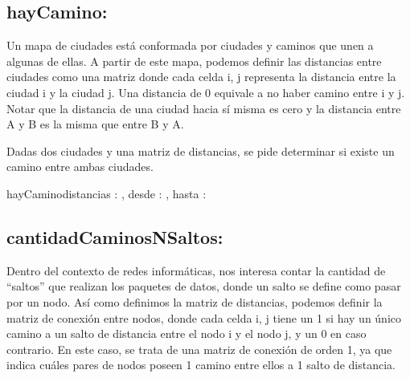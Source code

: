 \documentclass[10pt,a4paper]{article}
\begin{document}


\subsection{hayCamino:}

Un mapa de ciudades está conformada por ciudades y caminos que unen a algunas de ellas.
A partir de este mapa, podemos definir las distancias entre ciudades como una matriz donde cada celda i, j representa la distancia entre la ciudad i y la ciudad j. Una distancia de 0 equivale a no haber camino entre i y j.
Notar que la distancia de una ciudad hacia sí misma es cero y la distancia entre A y B es la misma que entre B y A.

Dadas dos ciudades y una matriz de distancias, se pide determinar si existe un camino entre ambas ciudades.\\

\begin{proc}{hayCamino}{\In distancias : \TLista{\TLista{\ent}}, \In desde : \ent, \In hasta : \ent}{\bool}
\end{proc}


\subsection{cantidadCaminosNSaltos:}

Dentro del contexto de redes informáticas, nos interesa contar la cantidad de “saltos” que realizan los paquetes de datos, donde un salto se define como pasar por un nodo.
Así como definimos la matriz de distancias, podemos definir la matriz de conexión entre nodos, donde cada celda i, j tiene un 1 si hay un único camino a un salto de distancia entre el nodo i y el nodo j, y un 0 en caso contrario.
En este caso, se trata de una matriz de conexión de orden 1, ya que indica cuáles pares de nodos poseen 1 camino entre ellos a 1 salto de distancia.
\end{document}
